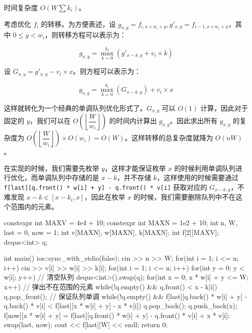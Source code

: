 时间复杂度 \(O(W\sum k_i)\)。

考虑优化 \(f_i\) 的转移。为方便表述，设 \(g_{x,y}=f_{i,x\times w_i+y},g'_{x,y}=f_{i-1,x\times w_i+y}\)，其中 \(0\le y \lt w_i\)，则转移方程可以表示为：

\[
g_{x,y}=\max_{k=0}^{k_i}(g'_{x-k,y}+v_i\times k)
\]

设 \(G_{x,y}=g'_{x,y}-v_i\times x\)。则方程可以表示为：

\[
g_{x,y}=\max_{k=0}^{k_i}(G_{x-k,y})+v_i\times x
\]

这样就转化为一个经典的单调队列优化形式了。\(G_{x,y}\) 可以 \(O(1)\) 计算，因此对于固定的 \(y\)，我们可以在 \(O\left( \left\lfloor \dfrac{W}{w_i} \right\rfloor \right)\) 的时间内计算出 \(g_{x,y}\)。因此求出所有 \(g_{x,y}\) 的复杂度为 \(O\left( \left\lfloor \dfrac{W}{w_i} \right\rfloor \right)\times O(w_i)=O(W)\)。这样转移的总复杂度就降为 \(O(nW)\)。

在实现的时候，我们需要先枚举 \(y\)，这样才能保证枚举 \(x\) 的时候利用单调队列进行优化，而单调队列中存储的是 \(x-k\)，并不存储 \(k\)，这样使用的时候需要通过 \texttt{f{[}last{]}{[}q.front()\ *\ w{[}i{]}\ +\ y{]}\ -\ q.front()\ *\ v{[}i{]}} 获取对应的 \(G_{x-k,y}\)，不难发现 \(x-k\in [x - k_i,x]\)，因此在枚举 \(x\) 的时候，我们需要删除队列中不在这个范围内的元素。


\begin{codeline}
constexpr int MAXV = 4e4 + 10;
constexpr int MAXN = 1e2 + 10;
int n, W, last = 0, now = 1;
int v[MAXN], w[MAXN], k[MAXN];
int f[2][MAXV];
deque<int> q;

int main() {
    ios::sync_with_stdio(false);
    cin >> n >> W;
    for(int i = 1; i <= n; i++) {
        cin >> v[i] >> w[i] >> k[i];
    }
    for(int i = 1; i <= n; i++) {
        for(int y = 0; y < w[i]; y++) {
            // 清空队列
            deque<int>().swap(q);
            for(int x = 0; x * w[i] + y <= W; x++) {
                // 弹出不在范围的元素
                while(!q.empty() && q.front() < x - k[i]) {
                    q.pop_front();
                }
                // 保证队列单调
                while(!q.empty() && f[last][q.back() * w[i] + y] - q.back() * v[i] <
                                        f[last][x * w[i] + y] - x * v[i]) {
                    q.pop_back();
                }
                q.push_back(x);
                f[now][x * w[i] + y] =
                    f[last][q.front() * w[i] + y] - q.front() * v[i] + x * v[i];
            }
        }
        swap(last, now);
    }
    cout << f[last][W] << endl;
    return 0;
}
\end{codeline}


